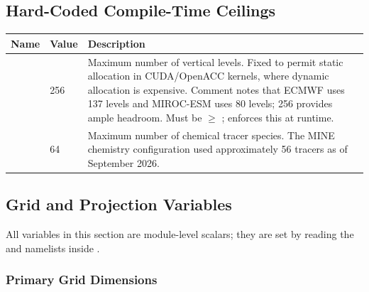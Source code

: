 \subsection{Hard-Coded Compile-Time Ceilings}
\label{subsec:dynparam_ceilings}

\begin{longtable}{L{3.5cm} L{2.5cm} L{8cm}}
  \toprule
  \textbf{Name} & \textbf{Value} & \textbf{Description} \\
  \midrule
  \endhead
  \bottomrule
  \endfoot
     & 256 &
    Maximum number of vertical levels. Fixed to permit static allocation in
    CUDA/OpenACC kernels, where dynamic allocation is expensive. Comment
    notes that ECMWF uses 137 levels and MIROC-ESM uses 80 levels; 256
    provides ample headroom. Must be $\geq$ ; 
    enforces this at runtime. \\
   & 64 &
    Maximum number of chemical tracer species. The MINE chemistry
    configuration used approximately 56 tracers as of September 2026. \\
\end{longtable}

\subsection{Grid and Projection Variables}
\label{subsec:dynparam_grid}

All variables in this section are module-level  scalars; they
are set by reading the  and  namelists inside
.

\subsubsection{Primary Grid Dimensions}

